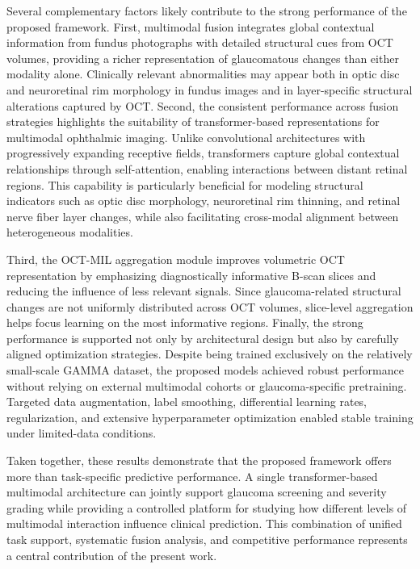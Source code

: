 \documentclass[preprint,12pt]{elsarticle}
\begin{document}
Several complementary factors likely contribute to the strong performance of the proposed framework. First, multimodal fusion integrates global contextual information from fundus photographs with detailed structural cues from OCT volumes, providing a richer representation of glaucomatous changes than either modality alone. Clinically relevant abnormalities may appear both in optic disc and neuroretinal rim morphology in fundus images and in layer-specific structural alterations captured by OCT. Second, the consistent performance across fusion strategies highlights the suitability of transformer-based representations for multimodal ophthalmic imaging. Unlike convolutional architectures with progressively expanding receptive fields, transformers capture global contextual relationships through self-attention, enabling interactions between distant retinal regions. This capability is particularly beneficial for modeling structural indicators such as optic disc morphology, neuroretinal rim thinning, and retinal nerve fiber layer changes, while also facilitating cross-modal alignment between heterogeneous modalities.

Third, the OCT-MIL aggregation module improves volumetric OCT representation by emphasizing diagnostically informative B-scan slices and reducing the influence of less relevant signals. Since glaucoma-related structural changes are not uniformly distributed across OCT volumes, slice-level aggregation helps focus learning on the most informative regions. Finally, the strong performance is supported not only by architectural design but also by carefully aligned optimization strategies. Despite being trained exclusively on the relatively small-scale GAMMA dataset, the proposed models achieved robust performance without relying on external multimodal cohorts or glaucoma-specific pretraining. Targeted data augmentation, label smoothing, differential learning rates, regularization, and extensive hyperparameter optimization enabled stable training under limited-data conditions.

Taken together, these results demonstrate that the proposed framework offers more than task-specific predictive performance. A single transformer-based multimodal architecture can jointly support glaucoma screening and severity grading while providing a controlled platform for studying how different levels of multimodal interaction influence clinical prediction. This combination of unified task support, systematic fusion analysis, and competitive performance represents a central contribution of the present work.
\end{document}
